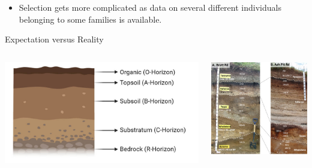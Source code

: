 \documentclass[11pt,dvipsnames,ignorenonframetext,aspectratio=169]{beamer}
\providecommand{\tightlist}{%
  \setlength{\itemsep}{0pt}\setlength{\parskip}{0pt}}
\begin{document}
\begin{frame}{}
\protect\hypertarget{section}{}
\begin{itemize}
\tightlist
\item
  Selection gets more complicated as data on several different
  individuals belonging to some families is available.
\end{itemize}

\centering Expectation versus Reality

\begin{columns}[T,onlytextwidth]



\includegraphics[width=0.8\linewidth]{../images/soil-profile-and-horizons} 



\includegraphics[width=0.8\linewidth]{../images/soil-profile-complex} 

\end{columns}
\end{frame}
\end{document}
